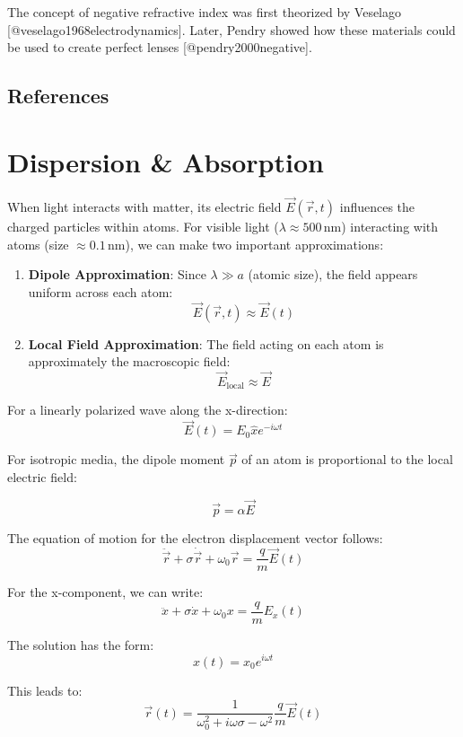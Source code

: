 \documentclass[
  a4paper,
]{book}
\begin{document}
The concept of negative refractive index was first theorized by Veselago
{[}@veselago1968electrodynamics{]}. Later, Pendry showed how these
materials could be used to create perfect lenses
{[}@pendry2000negative{]}.

\section*{References}\label{references}


\chapter{Dispersion \& Absorption}\label{dispersion-absorption}

When light interacts with matter, its electric field
\(\vec{E}(\vec{r},t)\) influences the charged particles within atoms.
For visible light (\(\lambda \approx 500\, \text{nm}\)) interacting with
atoms (size \(\approx 0.1\, \text{nm}\)), we can make two important
approximations:

\begin{enumerate}
\def\labelenumi{\arabic{enumi}.}
\item
  \textbf{Dipole Approximation}: Since \(\lambda \gg a\) (atomic size),
  the field appears uniform across each atom:
  \[\vec{E}(\vec{r},t) \approx \vec{E}(t)\]
\item
  \textbf{Local Field Approximation}: The field acting on each atom is
  approximately the macroscopic field:
  \[\vec{E}_\text{local} \approx \vec{E}\]
\end{enumerate}

For a linearly polarized wave along the x-direction:
\[\vec{E}(t)=E_0\hat{x} e^{-i\omega t}\]

For isotropic media, the dipole moment \(\vec{p}\) of an atom is
proportional to the local electric field:

\[\vec{p}=\alpha\vec{E}\]

The equation of motion for the electron displacement vector follows: \[
\ddot{\vec{r}}+\sigma\dot{\vec{r}}+\omega_0\vec{r}=\frac{q}{m}\vec{E}(t)
\]

For the x-component, we can write: \[
\ddot{x}+\sigma\dot{x}+\omega_0x=\frac{q}{m}E_x(t)
\]

The solution has the form: \[
x(t)=x_0 e^{i\omega t}
\]

This leads to: \[
\vec{r}(t)=\frac{1}{\omega_0^2+i\omega\sigma-\omega^2}\frac{q}{m}\vec{E}(t)
\]
\end{document}

